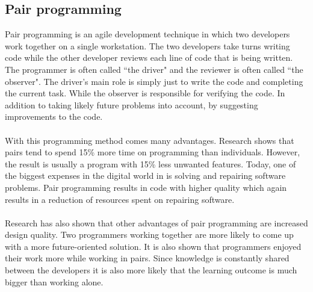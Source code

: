 \subsection{Pair programming}
Pair programming is an agile development technique in which two developers work together on a single workstation. The two developers take turns writing code while the other developer reviews each line of code that is being written. The programmer is often called ``the driver" and the reviewer is often called ``the observer". The driver's main role is simply just to write the code and completing the current task. While the observer is responsible for verifying the code. In addition to taking likely future problems into account, by suggesting improvements to the code.\cite{pp}\\
\\
With this programming method comes many advantages. Research shows that pairs tend to spend 15\% more time on programming than individuals. However, the result is usually a program with 15\% less unwanted features.\cite{pp2} Today, one of the biggest expenses in the digital world in is solving and repairing software problems. Pair programming results in code with higher quality which again results in a reduction of resources spent on repairing software.\\
\\
Research has also shown that other advantages of pair programming are increased design quality. Two programmers working together are more likely to come up with a more future-oriented solution. It is also shown that programmers enjoyed their work more while working in pairs. Since knowledge is constantly shared between the developers it is also more likely that the learning outcome is much bigger than working alone. 

